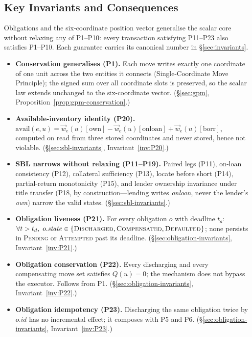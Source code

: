 \subsection*{Key Invariants and Consequences}

Obligations and the six-coordinate position vector generalise the scalar core without
relaxing any of P1--P10: every transaction satisfying P11--P23 also satisfies P1--P10. Each
guarantee carries its canonical number in \S\ref{sec:invariants}.

\begin{itemize}[nosep]
\item \textbf{Conservation generalises (P1).} Each move writes exactly one coordinate of
one unit across the two entities it connects (Single-Coordinate Move Principle); the signed
sum over all coordinate slots is preserved, so the scalar law extends unchanged to the
six-coordinate vector. (\S\ref{sec:gpm}, Proposition~\ref{prop:gpm-conservation}.)
\item \textbf{Available-inventory identity (P20).}
$\mathrm{avail}(e,u)=\vec w_e(u)[\mathrm{own}]-\vec w_e(u)[\mathrm{onloan}]+\vec
w_e(u)[\mathrm{borr}]$, computed on read from three stored coordinates and never stored,
hence not violable. (\S\ref{sec:sbl-invariants}, Invariant~\ref{inv:P20}.)
\item \textbf{SBL narrows without relaxing (P11--P19).} Paired legs (P11), on-loan
consistency (P12), collateral sufficiency (P13), locate before short (P14), partial-return
monotonicity (P15), and lender ownership invariance under title transfer (P18, by
construction---lending writes \emph{onloan}, never the lender's \emph{own}) narrow the
valid states. (\S\ref{sec:sbl-invariants}.)
\item \textbf{Obligation liveness (P21).} For every obligation $o$ with deadline $t_d$:
$\forall t>t_d,\ o.\mathit{state}\in\{\textsc{Discharged},\textsc{Compensated},\textsc{Defaulted}\}$;
none persists in \textsc{Pending} or \textsc{Attempted} past its deadline.
(\S\ref{sec:obligation-invariants}, Invariant~\ref{inv:P21}.)
\item \textbf{Obligation conservation (P22).} Every discharging and every compensating move
set satisfies $Q(u)=0$; the mechanism does not bypass the executor. Follows from P1.
(\S\ref{sec:obligation-invariants}, Invariant~\ref{inv:P22}.)
\item \textbf{Obligation idempotency (P23).} Discharging the same obligation twice by
$o.\mathit{id}$ has no incremental effect; it composes with P5 and P6.
(\S\ref{sec:obligation-invariants}, Invariant~\ref{inv:P23}.)
\end{itemize}
